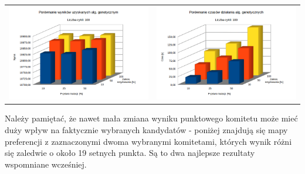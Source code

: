 \documentclass[pdflatex,11pt]{../aghdoc_version2}
\begin{document}
\begin{tabular}{cc}
\includegraphics[width=0.4\paperwidth]{pics/porownanie1/wynik100.png} & 
\includegraphics[width=0.4\paperwidth]{pics/porownanie1/czas100.png} \\
		
\end{tabular}

\newpage

Należy pamiętać, że nawet mała zmiana wyniku punktowego komitetu może mieć duży wpływ na faktycznie wybranych kandydatów - poniżej znajdują się mapy preferencji z zaznaczonymi dwoma wybranymi komitetami, których wynik różni się zaledwie o około 19 setnych punkta. Są to dwa najlepsze rezultaty wspomniane wcześniej.
\end{document}
